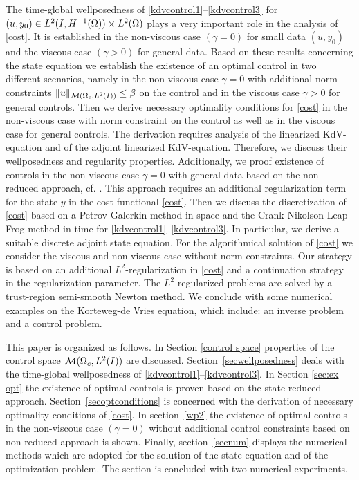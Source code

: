 The time-global wellposedness of \eqref{kdvcontrol1}--\eqref{kdvcontrol3} for $(u,y_0)\in \Hm1\times L^2(\Omega)$ plays a very important role in the analysis of \eqref{cost}. It is established in the non-viscous case $(\gamma=0)$ for small data $(u,y_0)$ and the viscous case $(\gamma>0)$ for general data. Based on these results concerning the state equation we establish the existence of an optimal control in two different scenarios, namely in the non-viscous case $\gamma=0$ with additional norm constraints $\|u\|_{\mathcal{M}(\Omega_c, L^{2}(I))}\leq \beta$ on the control and in the viscous case $\gamma>0$ for general controls. Then we derive necessary optimality conditions for \eqref{cost} in the non-viscous case with norm constraint on the control as well as in the viscous case for general controls. The derivation requires analysis of the linearized KdV-equation and of the adjoint linearized KdV-equation. Therefore, we discuss their wellposedness and regularity properties.  Additionally, we proof existence of controls in the non-viscous case $\gamma=0$ with general data based on the non-reduced approach, cf. \cite{lions1985control}. This approach requires an additional regularization term for the state $y$ in the cost functional \eqref{cost}. Then we discuss the discretization of \eqref{cost} based on a Petrov-Galerkin method in space and the Crank-Nikolson-Leap-Frog method in time for \eqref{kdvcontrol1}--\eqref{kdvcontrol3}. In particular, we derive a suitable discrete adjoint state equation. For the algorithmical solution of \eqref{cost} we consider the viscous and non-viscous case without norm constraints. Our strategy is based on an additional $L^2$-regularization in \eqref{cost} and a continuation strategy in the regularization parameter. The $L^2$-regularized problems are solved by a trust-region semi-smooth Newton method. We conclude with some numerical examples on the Korteweg-de Vries equation, which include: an inverse problem and a control problem.

This paper is organized as follows. In Section \ref{control space} properties of the control space $\mathcal{M}(\Omega_c, L^{2}(I))$ are discussed. Section~\ref{secwellposedness} deals with the time-global wellposedness of \eqref{kdvcontrol1}--\eqref{kdvcontrol3}. In Section \ref{sec:ex opt} the existence of optimal controls is proven based on the state reduced approach. Section~\ref{secoptconditions} is concerned with the derivation of necessary optimality conditions of \eqref{cost}. In section~\ref{wp2} the existence of optimal controls in the non-viscous case $(\gamma=0)$ without additional control constraints based on non-reduced approach is shown. Finally, section~\ref{secnum} displays the numerical methods which are adopted for the solution of the state equation and of the optimization problem. The section is concluded with two numerical experiments.
